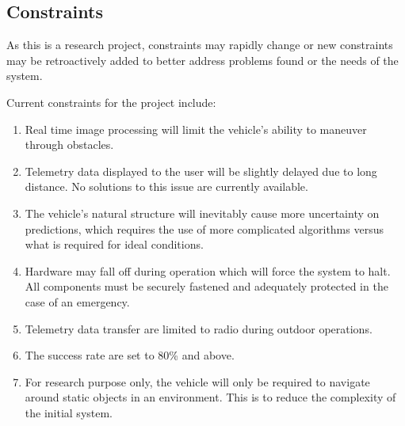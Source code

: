 \documentclass[compsoc,draftclsnofoot,onecolumn,10pt]{IEEEtran}
\begin{document}
\subsection{Constraints} %
As this is a research project, constraints may rapidly change or new constraints may be retroactively added to better address problems found or the needs of the system. \par
Current constraints for the project include: 
\begin{enumerate}
	\item Real time image processing will limit the vehicle's ability to maneuver through obstacles. 
	\item Telemetry data displayed to the user will be slightly delayed due to long distance. 
	No solutions to this issue are currently available.
	\item The vehicle's natural structure will inevitably cause more uncertainty on predictions, which requires the use of more complicated algorithms versus what is required for ideal conditions.
	\item Hardware may fall off during operation which will force the system to halt. 
	All components must be securely fastened and adequately protected in the case of an emergency.  
	\item Telemetry data transfer are limited to radio during outdoor operations.
	\item The success rate are set to 80\% and above.
	\item For research purpose only, the vehicle will only be required to navigate around static objects in an environment. 
	This is to reduce the complexity of the initial system. 
\end{enumerate}
\end{document}

